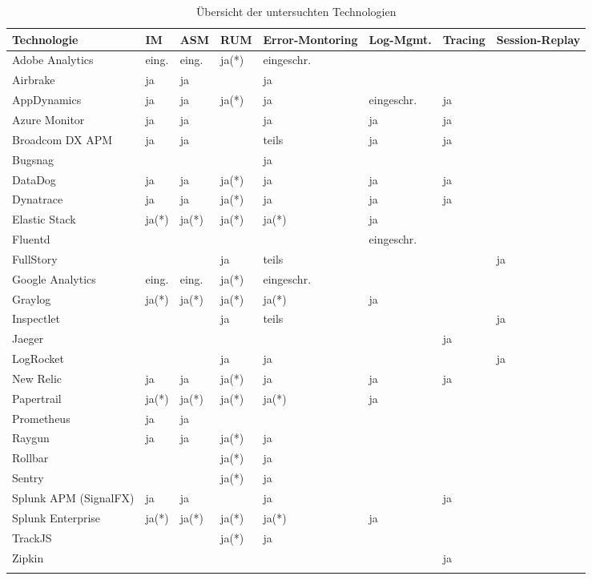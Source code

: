 \begingroup
\centering
\setlength{\LTleft}{-20cm plus -1fill}
\setlength{\LTright}{\LTleft}
\begin{longtable}{|p{4.10cm}|p{0.90cm}|p{0.90cm}|p{1.9cm}|p{1.75cm}|p{1.5cm}|p{1.4cm}|p{1.3cm}|}
\hline
Technologie & IM & ASM & RUM & Error-Montoring & Log-Mgmt. & Tracing & Session-Replay \\
\endhead
\hline
Adobe Analytics & eing. & eing. & ja(*) & eingeschr. &  &  &  \\
\hline
Airbrake & ja & ja &  & ja &  &  &  \\
\hline
AppDynamics & ja & ja & ja(*) & ja & eingeschr. & ja &  \\
\hline
Azure Monitor & ja & ja &  & ja & ja & ja &  \\
\hline
Broadcom DX APM & ja & ja &  & teils & ja & ja &  \\
\hline
Bugsnag &  &  &  & ja &  &  &  \\
\hline
DataDog & ja & ja & ja(*) & ja & ja & ja &  \\
\hline
Dynatrace & ja & ja & ja(*) & ja & ja & ja &  \\
\hline
Elastic Stack & ja(*) & ja(*) & ja(*) & ja(*) & ja &  &  \\
\hline
Fluentd &  &  &  &  & eingeschr. &  &  \\
\hline
FullStory &  &  & ja & teils &  &  & ja \\
\hline
Google Analytics & eing. & eing. & ja(*) & eingeschr. &  &  &  \\
\hline
Graylog & ja(*) & ja(*) & ja(*) & ja(*) & ja &  &  \\
\hline
Inspectlet &  &  & ja & teils &  &  & ja \\
\hline
Jaeger &  &  &  &  &  & ja &  \\
\hline
LogRocket &  &  & ja & ja &  &  & ja \\
\hline
New Relic & ja & ja & ja(*) & ja & ja & ja &  \\
\hline
Papertrail & ja(*) & ja(*) & ja(*) & ja(*) & ja &  &  \\
\hline
Prometheus & ja & ja &  &  &  &  &  \\
\hline
Raygun & ja & ja & ja(*) & ja &  &  &  \\
\hline
Rollbar &  &  & ja(*) & ja &  &  &  \\
\hline
Sentry &  &  & ja(*) & ja &  &  &  \\
\hline
Splunk APM (SignalFX) & ja & ja &  & ja &  & ja &  \\
\hline
Splunk \mbox{Enterprise} & ja(*) & ja(*) & ja(*) & ja(*) & ja &  &  \\
\hline
TrackJS &  &  & ja(*) & ja &  &  &  \\
\hline
Zipkin &  &  &  &  &  & ja &  \\
\hline
\caption{Übersicht der untersuchten Technologien}
\label{tab:technologie-uebersicht}
\end{longtable}
\endgroup
